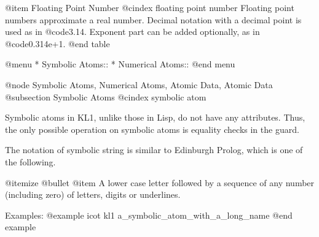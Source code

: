 @item Floating Point Number
@cindex floating point number
Floating point numbers approximate a real number.  Decimal notation with
a decimal point is used as in @code{3.14}.  Exponent part can be added
optionally, as in @code{0.314e+1}.
@end table

@menu
* Symbolic Atoms::              
* Numerical Atoms::             
@end menu

@node Symbolic Atoms, Numerical Atoms, Atomic Data, Atomic Data
@subsection Symbolic Atoms
@cindex symbolic atom

Symbolic atoms in KL1, unlike those in Lisp, do not have any attributes.
Thus, the only possible operation on symbolic atoms is equality checks
in the guard.

The notation of symbolic string is similar to Edinburgh Prolog, which is
one of the following.

@itemize @bullet
@item
A lower case letter followed by a sequence of any number (including
zero) of letters, digits or underlines.

Examples:
@example
icot   kl1   a_symbolic_atom_with_a_long_name
@end example

